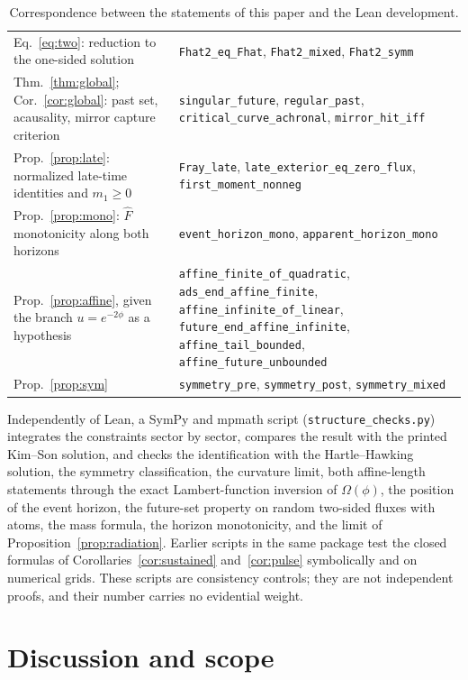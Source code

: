 \documentclass[11pt]{article}
\theoremstyle{remark}
\newcommand{\Fh}{\widehat F}
\newcommand{\lean}[1]{\texttt{#1}}
\begin{document}
\begin{table}[t]
\begin{tabular}{@{}>{\raggedright\arraybackslash}p{}>{\raggedright\arraybackslash}p{}@{}}
Eq.~\eqref{eq:two}: reduction to the one-sided solution & \lean{Fhat2\_eq\_Fhat}, \lean{Fhat2\_mixed}, \lean{Fhat2\_symm}\\
Thm.~\ref{thm:global}; Cor.~\ref{cor:global}: past set, acausality, mirror capture criterion & \lean{singular\_future}, \lean{regular\_past}, \lean{critical\_curve\_achronal}, \lean{mirror\_hit\_iff}\\
Prop.~\ref{prop:late}: normalized late-time identities and $m_1\ge0$ & \lean{Fray\_late}, \lean{late\_exterior\_eq\_zero\_flux}, \lean{first\_moment\_nonneg}\\
Prop.~\ref{prop:mono}: $\Fh$ monotonicity along both horizons & \lean{event\_horizon\_mono}, \lean{apparent\_horizon\_mono}\\
Prop.~\ref{prop:affine}, given the branch $u=e^{-2\phi}$ as a hypothesis & \lean{affine\_finite\_of\_quadratic}, \lean{ads\_end\_affine\_finite}, \lean{affine\_infinite\_of\_linear}, \lean{future\_end\_affine\_infinite}, \lean{affine\_tail\_bounded}, \lean{affine\_future\_unbounded}\\
Prop.~\ref{prop:sym} & \lean{symmetry\_pre}, \lean{symmetry\_post}, \lean{symmetry\_mixed}\\
\bottomrule
\end{tabular}
\caption{Correspondence between the statements of this paper and the Lean development.}
\label{tab:lean}
\end{table}

Independently of Lean, a SymPy and mpmath script (\texttt{structure\_checks.py}) integrates the constraints sector by sector, compares the result with the printed Kim--Son solution, and checks the identification with the Hartle--Hawking solution, the symmetry classification, the curvature limit, both affine-length statements through the exact Lambert-function inversion of $\Omega(\phi)$, the position of the event horizon, the future-set property on random two-sided fluxes with atoms, the mass formula, the horizon monotonicity, and the limit of Proposition~\ref{prop:radiation}. Earlier scripts in the same package test the closed formulas of Corollaries~\ref{cor:sustained} and~\ref{cor:pulse} symbolically and on numerical grids. These scripts are consistency controls; they are not independent proofs, and their number carries no evidential weight.

\section{Discussion and scope}\label{sec:discussion}
\end{document}
